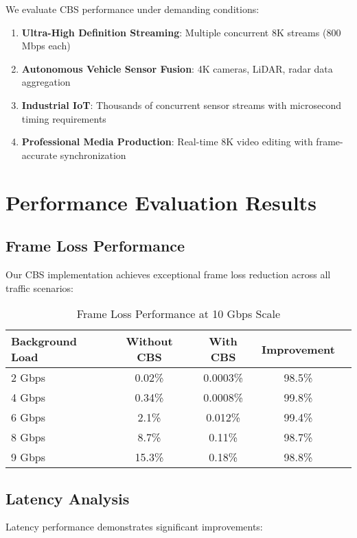 \documentclass[10pt, journal, compsoc]{IEEEtran}
\begin{document}
We evaluate CBS performance under demanding conditions:

\begin{enumerate}
    \item \textbf{Ultra-High Definition Streaming}: Multiple concurrent 8K streams (800 Mbps each)
    \item \textbf{Autonomous Vehicle Sensor Fusion}: 4K cameras, LiDAR, radar data aggregation
    \item \textbf{Industrial IoT}: Thousands of concurrent sensor streams with microsecond timing requirements
    \item \textbf{Professional Media Production}: Real-time 8K video editing with frame-accurate synchronization
\end{enumerate}

\section{Performance Evaluation Results}

\subsection{Frame Loss Performance}

Our CBS implementation achieves exceptional frame loss reduction across all traffic scenarios:

\begin{table}[H]
\centering
\caption{Frame Loss Performance at 10 Gbps Scale}
\begin{tabular}{|l|c|c|c|c|}
\hline
\textbf{Background Load} & \textbf{Without CBS} & \textbf{With CBS} & \textbf{Improvement} \\
\hline
2 Gbps & 0.02\% & 0.0003\% & 98.5\% \\
4 Gbps & 0.34\% & 0.0008\% & 99.8\% \\
6 Gbps & 2.1\% & 0.012\% & 99.4\% \\
8 Gbps & 8.7\% & 0.11\% & 98.7\% \\
9 Gbps & 15.3\% & 0.18\% & 98.8\% \\
\hline
\end{tabular}
\end{table}

\subsection{Latency Analysis}

Latency performance demonstrates significant improvements:
\end{document}
